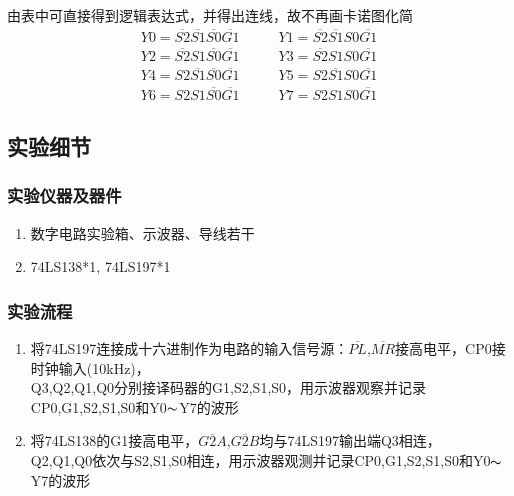 \documentclass[11pt,UTF8]{ctexart}
\begin{document}
\par 由表中可直接得到逻辑表达式，并得出连线，故不再画卡诺图化简
\[\begin{aligned}
Y0=\overline{S2}\overline{S1}\overline{S0}\overline{G1}&\qquad Y1=\overline{S2}\overline{S1}S0\overline{G1}\\
Y2=\overline{S2}S1\overline{S0}\overline{G1}&\qquad Y3=\overline{S2}S1S0\overline{G1}\\
Y4=S2\overline{S1}\overline{S0}\overline{G1}&\qquad Y5=S2\overline{S1}S0\overline{G1}\\
Y6=S2S1\overline{S0}\overline{G1}&\qquad Y7=S2S1S0\overline{G1}
\end{aligned}\]

\subsection{实验细节}
\subsubsection{实验仪器及器件}
\begin{enumerate}
    \item 数字电路实验箱、示波器、导线若干
    \item 74LS138*1, 74LS197*1
\end{enumerate}

\subsubsection{实验流程}
\begin{enumerate}
    \item 将74LS197连接成十六进制作为电路的输入信号源：$\overline{PL}$,$\overline{MR}$接高电平，CP0接时钟输入(10kHz)，\\
    Q3,Q2,Q1,Q0分别接译码器的G1,S2,S1,S0，用示波器观察并记录CP0,G1,S2,S1,S0和Y0$\thicksim$Y7的波形
    \item 将74LS138的G1接高电平，$\overline{G2A}$,$\overline{G2B}$均与74LS197输出端Q3相连，\\
    Q2,Q1,Q0依次与S2,S1,S0相连，用示波器观测并记录CP0,G1,S2,S1,S0和Y0$\thicksim$Y7的波形
\end{enumerate}
\end{document}
